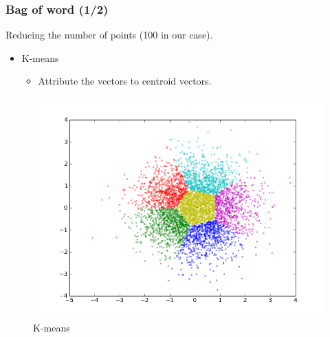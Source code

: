 \documentclass[xcolor=table]{beamer}
\begin{document}
\begin{frame} \frametitle{Bag of word (1/2)}
Reducing the number of points (100 in our case).

\begin{itemize}
    \item K-means
    \begin{itemize}
        \item Attribute the vectors to centroid vectors.
    \end{itemize}
\end{itemize}

\begin{figure}[h]
        \centering
        \includegraphics[scale=0.25]{k6n5000.png}
        \caption{K-means}
        \label{fig:kmeans}
    \end{figure}

\end{frame}
\end{document}
